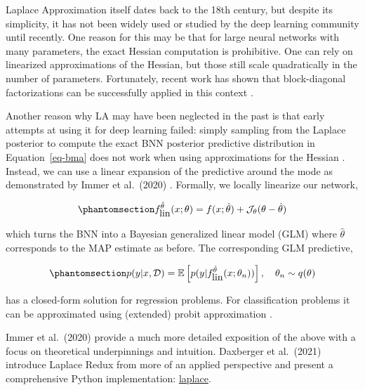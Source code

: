 \documentclass{juliacon}
\begin{document}
Laplace Approximation itself dates back to the 18th century, but despite
its simplicity, it has not been widely used or studied by the deep
learning community until recently. One reason for this may be that for
large neural networks with many parameters, the exact Hessian
computation is prohibitive. One can rely on linearized approximations of
the Hessian, but those still scale quadratically in the number of
parameters. Fortunately, recent work has shown that block-diagonal
factorizations can be successfully applied in this context
\cite{martens2015optimizing}.

Another reason why LA may have been neglected in the past is that early
attempts at using it for deep learning failed: simply sampling from the
Laplace posterior to compute the exact BNN posterior predictive
distribution in Equation~\ref{eq-bma} does not work when using
approximations for the Hessian \cite{lawrence2001variational}. Instead,
we can use a linear expansion of the predictive around the mode as
demonstrated by Immer et al.~(2020) \cite{immer2020improving}. Formally,
we locally linearize our network,

\begin{equation}\phantomsection\label{eq-glm}{
f^{\hat{\theta}}_{\mbox{lin}}(x;\theta)=f(x;\hat{\theta}) + \mathcal{J}_{\theta}(\theta-\hat{\theta})
}\end{equation}

which turns the BNN into a Bayesian generalized linear model (GLM) where
\(\hat{\theta}\) corresponds to the MAP estimate as before. The
corresponding GLM predictive,

\begin{equation}\phantomsection\label{eq-glm-predictive}{
p(y|x,\mathcal{D}) = \mathbb{E} \left[ p(y|f^{\hat{\theta}}_{\mbox{lin}}(x;\theta_n)) \right], \ \ \ \theta_n \sim q(\theta)
}\end{equation}

has a closed-form solution for regression problems. For classification
problems it can be approximated using (extended) probit approximation
\cite{daxberger2021laplace}.

Immer et al.~(2020) \cite{immer2020improving} provide a much more
detailed exposition of the above with a focus on theoretical
underpinnings and intuition. Daxberger et al.~(2021)
\cite{daxberger2021laplace} introduce Laplace Redux from more of an
applied perspective and present a comprehensive Python implementation:
\href{https://aleximmer.github.io/Laplace/}{laplace}.
\end{document}
